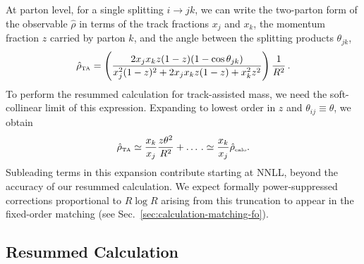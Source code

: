 \documentclass[letterpaper,11pt]{article}
\newcommand{\Sec}[1]{Sec.~\ref{#1}}
\begin{document}
At parton level, for a single splitting $i\rightarrow jk$, we can write the two-parton form of the observable $\hat{\rho}$ in terms of the track fractions $x_j$ and $x_k$, the momentum fraction $z$ carried by parton $k$, and the angle between the splitting products $\theta_{jk}$,
\begin{equation}
\label{eq:obs-ee-parton-def}
\hat{\rho}_{\mbox{\tiny TA}} = \left(\frac{2x_jx_kz(1-z)(1-\cos\theta_{jk})}{x_j^2(1-z)^2 + 2x_jx_kz(1-z) + x_k^2z^2}\right) \frac{1}{R^2}\,.
\end{equation}
To perform the resummed calculation for track-assisted mass, we need the soft-collinear limit of this expression. 
%
Expanding to lowest order in $z$ and $\theta_{ij}\equiv \theta$, we obtain 
\begin{equation}
\label{eq:observable-sc-limit}
\hat{\rho}_{\mbox{\tiny TA}} \simeq \frac{x_k}{x_j} \frac{z \theta^2}{R^2} + \dots \,. \simeq \frac{x_k}{x_j}\hat{\rho}_{\mbox{\tiny calo}}.
\end{equation}
Subleading terms in this expansion contribute starting at NNLL, beyond the accuracy of our resummed calculation.
%
We expect formally power-suppressed corrections proportional to $R \log R$ arising from this truncation to appear in the fixed-order matching (see \Sec{sec:calculation-matching-fo}).






\subsection{Resummed Calculation}
\label{sec:calculation-resummed}

\end{document}
